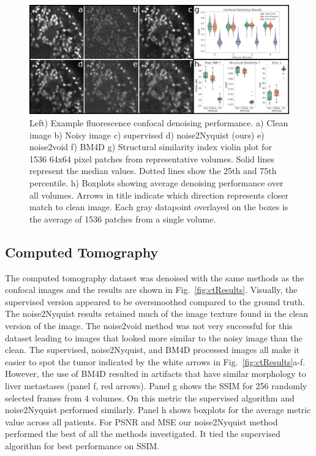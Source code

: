 \documentclass[journal,twoside,web]{ieeecolor}
\begin{document}
\begin{figure}[htb]
	\begin{center}
		\includegraphics[width=\textwidth]{confocal/confocalFig_ver02}
		\caption{\label{fig:confocalResults}Left) Example fluorescence confocal denoising performance. a) Clean image b) Noisy image c) supervised  d) noise2Nyquist (ours) e) noise2void f) BM4D g) Structural similarity index violin plot for 1536 64x64 pixel patches from representative volumes. Solid lines represent the median values. Dotted lines show the 25th and 75th percentile. h) Boxplots showing average denoising performance over all volumes. Arrows in title indicate which direction represents closer match to clean image. Each gray datapoint overlayed on the boxes is the average of 1536 patches from a single volume.}
	\end{center}
\end{figure}

\subsection{Computed Tomography}
The computed tomography dataset was denoised with the same methods as the confocal images and the results are shown in Fig.~\ref{fig:ctResults}. Visually, the supervised version appeared to be oversmoothed compared to the ground truth. The noise2Nyquist results retained much of the image texture found in the clean version of the image. The noise2void method was not very successful for this dataset leading to images that looked more similar to the noisy image than the clean. The supervised, noise2Nyquist, and BM4D processed images all make it easier to spot the tumor indicated by the white arrows in Fig.~\ref{fig:ctResults}a-f. However, the use of BM4D resulted in artifacts that have similar morphology to liver metastases (panel f, red arrows). Panel g shows the SSIM for 256 randomly selected frames from 4 volumes. On this metric the supervised algorithm and noise2Nyquist performed similarly. Panel h shows boxplots for the average metric value across all patients. For PSNR and MSE our noise2Nyquist method performed the best of all the methods investigated. It tied the supervised algorithm for best performance on SSIM. 
\end{document}
